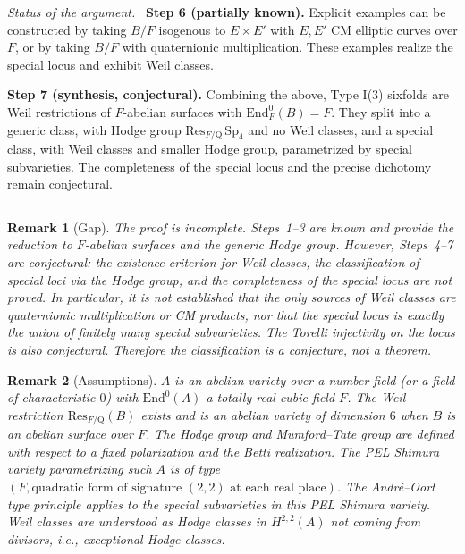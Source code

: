 \documentclass{article}
\newcommand{\mathbb}[1]{\mathrm{#1}}
\newtheorem{remark}{Remark}
\newenvironment{proof}[1][Proof]{\par\noindent\textit{#1.}\ }{\hfill\rule{1.2ex}{1.2ex}\par}
\begin{document}
\begin{proof}[Status of the argument]
\medskip
\noindent\textbf{Step 6 (partially known).}
Explicit examples can be constructed by taking \(B/F\) isogenous to \(E \times E'\)
with \(E, E'\) CM elliptic curves over \(F\), or by taking \(B/F\) with quaternionic
multiplication. These examples realize the special locus and exhibit Weil classes.

\medskip
\noindent\textbf{Step 7 (synthesis, conjectural).}
Combining the above, Type I(3) sixfolds are Weil restrictions of \(F\)-abelian
surfaces with \(\mathrm{End}^0_F(B) = F\). They split into a generic class, with Hodge
group \(\mathrm{Res}_{F/\mathbb{Q}}\,\mathrm{Sp}_4\) and no Weil classes, and a special
class, with Weil classes and smaller Hodge group, parametrized by special subvarieties.
The completeness of the special locus and the precise dichotomy remain conjectural.
\end{proof}

\begin{remark}[Gap]
The proof is incomplete. Steps~1--3 are known and provide the reduction to
\(F\)-abelian surfaces and the generic Hodge group. However, Steps~4--7 are
conjectural: the existence criterion for Weil classes, the classification of special
loci via the Hodge group, and the completeness of the special locus are not proved.
In particular, it is not established that the only sources of Weil classes are
quaternionic multiplication or CM products, nor that the special locus is exactly the
union of finitely many special subvarieties. The Torelli injectivity on the locus is
also conjectural. Therefore the classification is a conjecture, not a theorem.
\end{remark}

\begin{remark}[Assumptions]
\(A\) is an abelian variety over a number field (or a field of characteristic \(0\))
with \(\mathrm{End}^0(A)\) a totally real cubic field \(F\). The Weil restriction
\(\mathrm{Res}_{F/\mathbb{Q}}(B)\) exists and is an abelian variety of dimension \(6\)
when \(B\) is an abelian surface over \(F\). The Hodge group and Mumford--Tate group
are defined with respect to a fixed polarization and the Betti realization. The PEL
Shimura variety parametrizing such \(A\) is of type \((F, \text{quadratic form of
signature } (2,2) \text{ at each real place})\). The Andr\'e--Oort type principle
applies to the special subvarieties in this PEL Shimura variety. Weil classes are
understood as Hodge classes in \(H^{2,2}(A)\) not coming from divisors, i.e.,
exceptional Hodge classes.
\end{remark}
\end{document}
